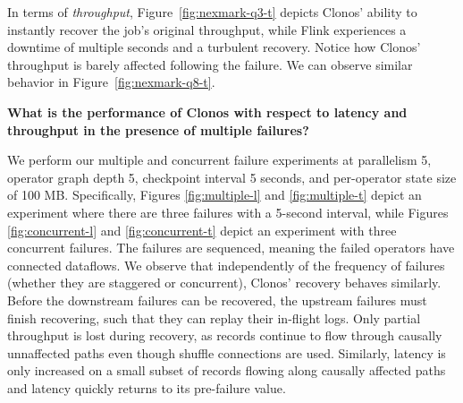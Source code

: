 \documentclass[sigconf]{acmart}
\begin{document}
In terms of \textit{throughput}, Figure~\ref{fig:nexmark-q3-t} depicts Clonos' ability to instantly recover the job's original throughput, while Flink experiences a downtime of multiple seconds and a turbulent recovery.
Notice how Clonos' throughput is barely affected following the failure. We can observe similar behavior in Figure~\ref{fig:nexmark-q8-t}.

\vspace{3mm}
\begin{myframe}
\textbf{What is the performance of Clonos with respect to latency and  throughput in the presence of multiple failures?}
\end{myframe}
\vspace{2mm}

We perform our multiple and concurrent failure experiments at parallelism 5, operator graph depth 5, checkpoint interval 5 seconds, and per-operator state size of 100 MB. Specifically, Figures \ref{fig:multiple-l} and \ref{fig:multiple-t} depict an experiment where there are three failures with a 5-second interval, while Figures \ref{fig:concurrent-l} and \ref{fig:concurrent-t} depict an experiment with three concurrent failures. 
The failures are sequenced, meaning the failed operators have connected dataflows. 
We observe that independently of the frequency of failures (whether they are staggered or concurrent), Clonos' recovery behaves similarly. Before the downstream failures can be recovered, the upstream failures must finish recovering, such that they can replay their in-flight logs.
Only partial throughput is lost during recovery, as records continue to flow through causally unnaffected paths even though shuffle connections are used. Similarly, latency is only increased on a small subset of records flowing along causally affected paths and latency quickly returns to its pre-failure value.
\end{document}
